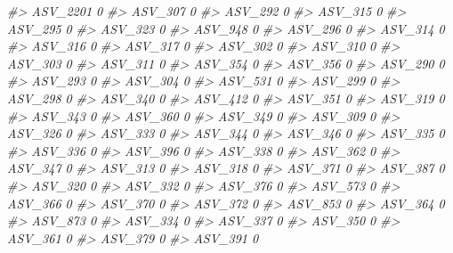 \documentclass[
]{article}
\newenvironment{Shaded}{\begin{snugshade}}{\end{snugshade}}
\newcommand{\CommentTok}[1]{\textcolor[rgb]{0.56,0.35,0.01}{\textit{#1}}}
\begin{document}
\begin{Shaded}
\begin{Highlighting}[]
\CommentTok{\#\textgreater{} ASV\_2201  0}
\CommentTok{\#\textgreater{} ASV\_307   0}
\CommentTok{\#\textgreater{} ASV\_292   0}
\CommentTok{\#\textgreater{} ASV\_315   0}
\CommentTok{\#\textgreater{} ASV\_295   0}
\CommentTok{\#\textgreater{} ASV\_323   0}
\CommentTok{\#\textgreater{} ASV\_948   0}
\CommentTok{\#\textgreater{} ASV\_296   0}
\CommentTok{\#\textgreater{} ASV\_314   0}
\CommentTok{\#\textgreater{} ASV\_316   0}
\CommentTok{\#\textgreater{} ASV\_317   0}
\CommentTok{\#\textgreater{} ASV\_302   0}
\CommentTok{\#\textgreater{} ASV\_310   0}
\CommentTok{\#\textgreater{} ASV\_303   0}
\CommentTok{\#\textgreater{} ASV\_311   0}
\CommentTok{\#\textgreater{} ASV\_354   0}
\CommentTok{\#\textgreater{} ASV\_356   0}
\CommentTok{\#\textgreater{} ASV\_290   0}
\CommentTok{\#\textgreater{} ASV\_293   0}
\CommentTok{\#\textgreater{} ASV\_304   0}
\CommentTok{\#\textgreater{} ASV\_531   0}
\CommentTok{\#\textgreater{} ASV\_299   0}
\CommentTok{\#\textgreater{} ASV\_298   0}
\CommentTok{\#\textgreater{} ASV\_340   0}
\CommentTok{\#\textgreater{} ASV\_412   0}
\CommentTok{\#\textgreater{} ASV\_351   0}
\CommentTok{\#\textgreater{} ASV\_319   0}
\CommentTok{\#\textgreater{} ASV\_343   0}
\CommentTok{\#\textgreater{} ASV\_360   0}
\CommentTok{\#\textgreater{} ASV\_349   0}
\CommentTok{\#\textgreater{} ASV\_309   0}
\CommentTok{\#\textgreater{} ASV\_326   0}
\CommentTok{\#\textgreater{} ASV\_333   0}
\CommentTok{\#\textgreater{} ASV\_344   0}
\CommentTok{\#\textgreater{} ASV\_346   0}
\CommentTok{\#\textgreater{} ASV\_335   0}
\CommentTok{\#\textgreater{} ASV\_336   0}
\CommentTok{\#\textgreater{} ASV\_396   0}
\CommentTok{\#\textgreater{} ASV\_338   0}
\CommentTok{\#\textgreater{} ASV\_362   0}
\CommentTok{\#\textgreater{} ASV\_347   0}
\CommentTok{\#\textgreater{} ASV\_313   0}
\CommentTok{\#\textgreater{} ASV\_318   0}
\CommentTok{\#\textgreater{} ASV\_371   0}
\CommentTok{\#\textgreater{} ASV\_387   0}
\CommentTok{\#\textgreater{} ASV\_320   0}
\CommentTok{\#\textgreater{} ASV\_332   0}
\CommentTok{\#\textgreater{} ASV\_376   0}
\CommentTok{\#\textgreater{} ASV\_573   0}
\CommentTok{\#\textgreater{} ASV\_366   0}
\CommentTok{\#\textgreater{} ASV\_370   0}
\CommentTok{\#\textgreater{} ASV\_372   0}
\CommentTok{\#\textgreater{} ASV\_853   0}
\CommentTok{\#\textgreater{} ASV\_364   0}
\CommentTok{\#\textgreater{} ASV\_873   0}
\CommentTok{\#\textgreater{} ASV\_334   0}
\CommentTok{\#\textgreater{} ASV\_337   0}
\CommentTok{\#\textgreater{} ASV\_350   0}
\CommentTok{\#\textgreater{} ASV\_361   0}
\CommentTok{\#\textgreater{} ASV\_379   0}
\CommentTok{\#\textgreater{} ASV\_391   0}

\end{Highlighting}
\end{Shaded}
\end{document}
